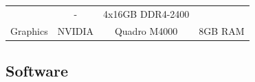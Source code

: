 \documentclass[11pt,singlespacinge,twoside]{reedthesis} %
\theoremstyle{definition}
\theoremstyle{definition}
\theoremstyle{definition}
\theoremstyle{remark}
\begin{document}
\begin{longtable}[]{@{}rccl@{}}
\begin{minipage}[t]{0.20\columnwidth}
\end{minipage} & \begin{minipage}[t]{0.22\columnwidth}\centering
-\strut
\end{minipage} & \begin{minipage}[t]{0.28\columnwidth}\raggedright
4x16GB DDR4-2400\strut
\end{minipage}\tabularnewline
\begin{minipage}[t]{0.19\columnwidth}\raggedleft
Graphics\strut
\end{minipage} & \begin{minipage}[t]{0.20\columnwidth}\centering
NVIDIA\strut
\end{minipage} & \begin{minipage}[t]{0.22\columnwidth}\centering
Quadro M4000\strut
\end{minipage} & \begin{minipage}[t]{0.28\columnwidth}\raggedright
8GB RAM\strut
\end{minipage}\tabularnewline
\bottomrule
\end{longtable}
\hypertarget{mat-sftwr}{%
\subsection{Software}\label{mat-sftwr}}
\end{document}
